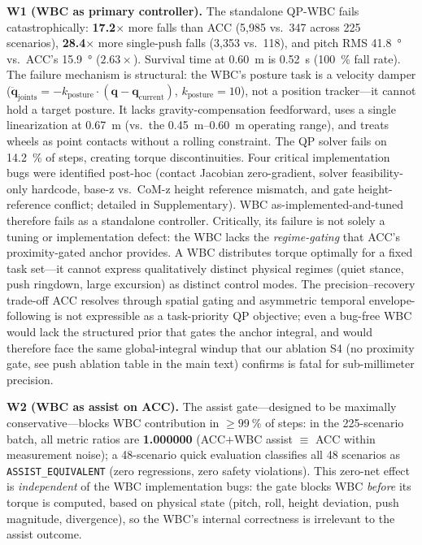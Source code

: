 \medskip\noindent\textbf{W1 (WBC as primary controller).}
The standalone QP-WBC fails catastrophically: \textbf{\num{17.2}$\times$} more falls than ACC (5{,}985 vs.\ 347 across 225 scenarios), \textbf{\num{28.4}$\times$} more single-push falls (3{,}353 vs.\ 118), and pitch RMS \SI{41.8}{\degree} vs.\ ACC's \SI{15.9}{\degree} ($\num{2.63}\times$).
Survival time at \SI{0.60}{m} is \SI{0.52}{s} (\SI{100}{\percent} fall rate).
The failure mechanism is structural: the WBC's posture task is a velocity damper ($\ddot{\mathbf{q}}_{\text{joints}} = -k_{\text{posture}}\!\cdot\!(\mathbf{q} - \mathbf{q}_{\text{current}})$, $k_{\text{posture}}{=}10$), not a position tracker---it cannot hold a target posture.
It lacks gravity-compensation feedforward, uses a single linearization at \SI{0.67}{m} (vs.\ the \SIrange{0.45}{0.60}{m} operating range), and treats wheels as point contacts without a rolling constraint.
The QP solver fails on \SI{14.2}{\percent} of steps, creating torque discontinuities.
Four critical implementation bugs were identified post-hoc (contact Jacobian zero-gradient, solver feasibility-only hardcode, base-z vs.\ CoM-z height reference mismatch, and gate height-reference conflict; detailed in Supplementary).
WBC as-implemented-and-tuned therefore fails as a standalone controller.
Critically, its failure is not solely a tuning or implementation defect: the WBC lacks the \emph{regime-gating} that ACC's proximity-gated anchor provides.
A WBC distributes torque optimally for a fixed task set---it cannot express qualitatively distinct physical regimes (quiet stance, push ringdown, large excursion) as distinct control modes.
The precision--recovery trade-off ACC resolves through spatial gating and asymmetric temporal envelope-following is not expressible as a task-priority QP objective; even a bug-free WBC would lack the structured prior that gates the anchor integral, and would therefore face the same global-integral windup that our ablation S4 (no proximity gate, see push ablation table in the main text) confirms is fatal for sub-millimeter precision.

\medskip\noindent\textbf{W2 (WBC as assist on ACC).}
The assist gate---designed to be maximally conservative---blocks WBC contribution in ${\ge}\SI{99}{\percent}$ of steps:
in the 225-scenario batch, all metric ratios are \textbf{\num{1.000000}} (ACC$+$WBC assist $\equiv$ ACC within measurement noise); a 48-scenario quick evaluation classifies all 48 scenarios as \texttt{ASSIST\_EQUIVALENT} (zero regressions, zero safety violations).
This zero-net effect is \emph{independent} of the WBC implementation bugs: the gate blocks WBC \emph{before} its torque is computed, based on physical state (pitch, roll, height deviation, push magnitude, divergence), so the WBC's internal correctness is irrelevant to the assist outcome.

